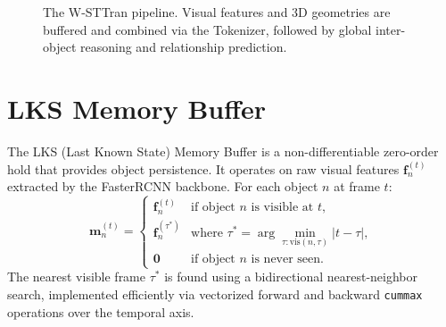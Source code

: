 \documentclass{article}
\newcommand{\mat}[1]{\bm{#1}}
\begin{document}
\begin{figure}[h]
\centering
{}
\caption{The W-STTran pipeline. Visual features and 3D geometries are buffered and combined via the Tokenizer, followed by global inter-object reasoning and relationship prediction.}
\label{fig:pipeline_wsttran}
\end{figure}


\section{LKS Memory Buffer}
\label{sec:lks}

The LKS (Last Known State) Memory Buffer is a non-differentiable zero-order hold that provides object persistence. It operates on raw visual features $\mat{f}_n^{(t)}$ extracted by the FasterRCNN backbone. For each object $n$ at frame $t$:
\begin{equation}
    \mat{m}_n^{(t)} = \begin{cases}
        \mat{f}_n^{(t)} & \text{if object $n$ is visible at $t$}, \\
        \mat{f}_n^{(\tau^*)} & \text{where } \tau^* = \arg\min_{\tau:\text{vis}(n,\tau)} |t - \tau|, \\
        \bm{0} & \text{if object $n$ is never seen}.
    \end{cases}
    \label{eq:lks_buffer}
\end{equation}
The nearest visible frame $\tau^*$ is found using a bidirectional nearest-neighbor search, implemented efficiently via vectorized forward and backward \texttt{cummax} operations over the temporal axis.
\end{document}
